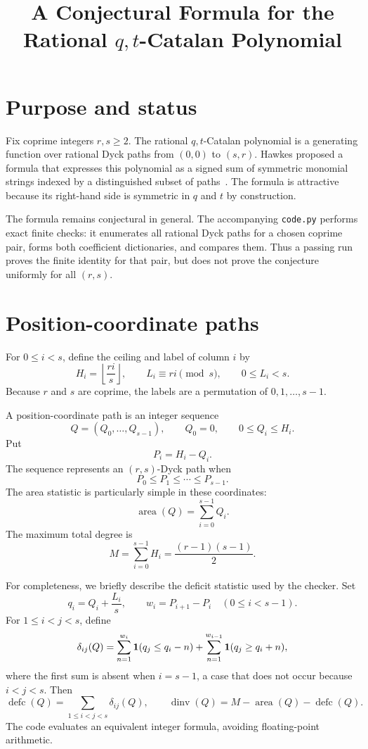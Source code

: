 \documentclass{article}
\title{A Conjectural Formula for the Rational \(q,t\)-Catalan Polynomial}
\author{}
\date{}
\newcommand{\area}{\operatorname{area}}
\newcommand{\dinv}{\operatorname{dinv}}
\newcommand{\defc}{\operatorname{defc}}
\begin{document}
\maketitle

\section{Purpose and status}

Fix coprime integers \(r,s\ge2\).  The rational \(q,t\)-Catalan polynomial
is a generating function over rational Dyck paths from \((0,0)\) to
\((s,r)\).  Hawkes proposed a formula that expresses this polynomial as a
signed sum of symmetric monomial strings indexed by a distinguished subset of
paths~\cite{Hawkes2024}.  The formula is attractive because its right-hand
side is symmetric in \(q\) and \(t\) by construction.

The formula remains conjectural in general.  The accompanying
\texttt{code.py} performs exact finite checks: it enumerates all rational Dyck
paths for a chosen coprime pair, forms both coefficient dictionaries, and
compares them.  Thus a passing run proves the finite identity for that pair,
but does not prove the conjecture uniformly for all \((r,s)\).

\section{Position-coordinate paths}

For \(0\le i<s\), define the ceiling and label of column \(i\) by
\[
  H_i=\left\lfloor\frac{ri}{s}\right\rfloor,
  \qquad
  L_i\equiv ri\pmod s,
  \qquad 0\le L_i<s.
\]
Because \(r\) and \(s\) are coprime, the labels are a permutation of
\(0,1,\ldots,s-1\).

A position-coordinate path is an integer sequence
\[
  Q=(Q_0,\ldots,Q_{s-1}),
  \qquad
  Q_0=0,
  \qquad
  0\le Q_i\le H_i.
\]
Put
\[
  P_i=H_i-Q_i.
\]
The sequence represents an \((r,s)\)-Dyck path when
\[
  P_0\le P_1\le\cdots\le P_{s-1}.
\]
The area statistic is particularly simple in these coordinates:
\[
  \area(Q)=\sum_{i=0}^{s-1}Q_i.
\]
The maximum total degree is
\[
  M=\sum_{i=0}^{s-1}H_i
   =\frac{(r-1)(s-1)}{2}.
\]

For completeness, we briefly describe the deficit statistic used by the
checker.  Set
\[
  q_i=Q_i+\frac{L_i}{s},
  \qquad
  w_i=P_{i+1}-P_i
  \quad(0\le i<s-1).
\]
For \(1\le i<j<s\), define
\[
  \delta_{ij}(Q)
  =
  \sum_{n=1}^{w_i}{\bf 1}(q_j\le q_i-n)
  +
  \sum_{n=1}^{w_{i-1}}{\bf 1}(q_j\ge q_i+n),
\]
where the first sum is absent when \(i=s-1\), a case that does not occur
because \(i<j<s\).  Then
\[
  \defc(Q)=\sum_{1\le i<j<s}\delta_{ij}(Q),
  \qquad
  \dinv(Q)=M-\area(Q)-\defc(Q).
\]
The code evaluates an equivalent integer formula, avoiding floating-point
arithmetic.
\end{document}
